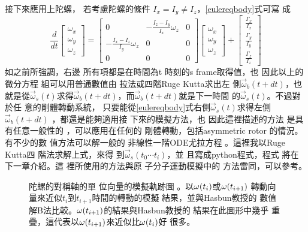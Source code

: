 \documentclass[12pt,twoside]{article}
\begin{document}
接下來應用上陀螺，%
若考慮陀螺的條件 $%
I_{x}=I_{y}\neq I_{z}$，\ref{eulereqbody}式可寫%
成%
\begin{equation}
\frac{d}{dt}\left[ 
\begin{array}{c}
\omega _{x} \\ 
\omega _{y} \\ 
\omega _{z}%
\end{array}%
\right] =\left[ 
\begin{array}{ccc}
0 & -\frac{I_{z}-I_{y}}{I_{x}}\omega _{z} & 0 \\ 
-\frac{I_{x}-I_{z}}{I_{y}}\omega _{z} & 0 & 0 \\ 
0 & 0 & 0%
\end{array}%
\right] \left[ 
\begin{array}{c}
\omega _{x} \\ 
\omega _{y} \\ 
\omega _{z}%
\end{array}%
\right] +\left[ 
\begin{array}{c}
\frac{\Gamma _{x}}{I_{x}} \\ 
\frac{\Gamma _{y}}{I_{y}} \\ 
\frac{\Gamma _{z}}{I_{z}}%
\end{array}%
\right] 
\end{equation}%
如之前所強調，右邊%
所有項都是在時間為t%
時刻的s frame取得值，也%
因此以上的微分方程%
組可以用普通數值由%
拉法或四階Ruge Kutta求出左%
側$\vec{\omega}_{b}(t+dt)$，也就是從$%
\vec{\omega}_{s}(t)$求得$\vec{\omega}_{b}(t+dt)$，而$%
\vec{\omega}_{b}(t+dt)$就是下一時間%
的$\vec{\omega}_{s}(t)$。不過對於任%
意的剛體轉動系統，%
只要能從\ref{eulereqbody}式右側$%
\vec{\omega}_{s}(t)$求得左側$\vec{\omega}_{b}(t+dt)$%
，都還是能夠適用接%
下來的模擬方法，也%
因此這裡描述的方法%
是具有任意一般性的%
，可以應用在任何的%
剛體轉動，包括asymmetric rotor%
的情況。有不少的數%
值方法可以解一般的%
非線性一階ODE尤拉方程%
\cite{matlab}。這裡我以Ruge Kutta四%
階法求解上式，來得%
到$\vec{\omega}_{s}\left( t_{0}\cdots t_{i}\right) $，並%
且寫成python程式，程式%
將在下一章介紹。這%
裡所使用的方法與原%
子分子運動模擬中的%
方法雷同，可以參考\cite%
{rapaport}。

\begin{figure}[th]
\caption{陀螺的對稱軸的單%
位向量的模擬軌跡圖%
。以$\protect\omega (t_{i})$或$\protect\omega (t_{i+1})$%
轉動向量來近似$t_{i}$到$%
t_{i+1}$時間的轉動的模擬%
結果，並與Hasbun教授的%
數值解B法比較。$\protect\omega %
(t_{i+1})$的結果與Hasbun教授的%
結果在此圖形中幾乎%
重疊，這代表以$\protect\omega %
(t_{i+1})$來近似比$\protect\omega (t_{i})$好%
很多。}
\label{wtiwti1}
\begin{center}
\fbox{}
\end{center}
\end{figure}
\end{document}
